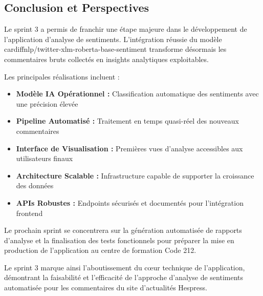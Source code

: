 \subsection{Conclusion et Perspectives}

Le sprint 3 a permis de franchir une étape majeure dans le développement de l'application d'analyse de sentiments. L'intégration réussie du modèle cardiffnlp/twitter-xlm-roberta-base-sentiment transforme désormais les commentaires bruts collectés en insights analytiques exploitables.

Les principales réalisations incluent :

\begin{itemize}
    \item \textbf{Modèle IA Opérationnel :} Classification automatique des sentiments avec une précision élevée
    \item \textbf{Pipeline Automatisé :} Traitement en temps quasi-réel des nouveaux commentaires
    \item \textbf{Interface de Visualisation :} Premières vues d'analyse accessibles aux utilisateurs finaux
    \item \textbf{Architecture Scalable :} Infrastructure capable de supporter la croissance des données
    \item \textbf{APIs Robustes :} Endpoints sécurisés et documentés pour l'intégration frontend
\end{itemize}

Le prochain sprint se concentrera sur la génération automatisée de rapports d'analyse et la finalisation des tests fonctionnels pour préparer la mise en production de l'application au centre de formation Code 212.

Le sprint 3 marque ainsi l'aboutissement du cœur technique de l'application, démontrant la faisabilité et l'efficacité de l'approche d'analyse de sentiments automatisée pour les commentaires du site d'actualités Hespress.